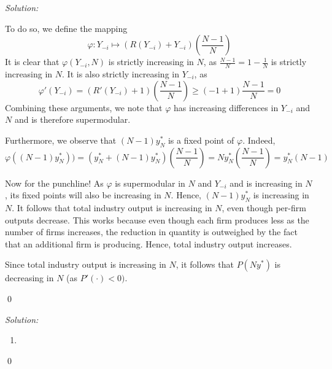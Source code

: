 \documentclass[12pt]{article}
\newenvironment{problem}[2][Problem]{\begin{trivlist}
\item[\hskip \labelsep {\bfseries #1}\hskip \labelsep {\bfseries #2.}]}{\end{trivlist}}
\newenvironment{sol}
    {\emph{Solution:}
    }
    {
    \qed
    }
\begin{document}
\begin{sol}
\begin{enumerate}[label=\alph*)]
    To do so, we define the mapping 
    \[\varphi : Y_{-i} \mapsto (R(Y_{-i}) + Y_{-i}) \left(\frac{N-1}{N}\right)\]
    It is clear that $\varphi(Y_{-i}, N)$ is strictly increasing in $N$, as $\frac{N-1}{N} = 1 - \frac{1}{N}$ is strictly increasing in $N$. It is also strictly increasing in $Y_{-i}$, as 
    \[\varphi'(Y_{-i}) = (R'(Y_{-i}) + 1)\left( \frac{N-1}{N}\right) \geq (-1 + 1) \frac{N-1}{N} = 0\]
    Combining these arguments, we note that $\varphi$ has increasing differences in $Y_{-i}$ and $N$ and is therefore supermodular. 
    
    Furthermore, we observe that $(N-1)y^*_{N}$ is a fixed point of $\varphi$. Indeed,
    \[\varphi((N-1)y^*_N)) = (y^*_N + (N-1)y^*_N)\left(\frac{N-1}{N}\right) = N y^*_N \left( \frac{N-1}{N}\right) = y^*_N (N-1)\]
    
    Now for the punchline! As $\varphi$ is supermodular in $N$ and $Y_{-i}$ and is increasing in $N$, its fixed points will also be increasing in $N$. Hence, $(N-1) y^*_N$ is increasing in $N$. It follows that total industry output is increasing in $N$, even though per-firm outputs decrease. This works because even though each firm produces less as the number of firms increases, the reduction in quantity is outweighed by the fact that an additional firm is producing. Hence, total industry output increases. 

    Since total industry output is increasing in $N$, it follows that $P(Ny^*)$ is decreasing in $N$ (as $P'(\cdot) < 0)$.
\end{enumerate}
\end{sol}
\begin{problem}{2}
\end{problem}
\begin{sol}
\begin{enumerate}[label=\alph*) ]
    \item 
\end{enumerate}
\end{sol}
\end{document}
